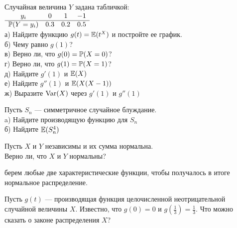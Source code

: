 \begin{solution}
\begin{solution}
\begin{solution}
\begin{solution}
\begin{solution}
\begin{solution}
\begin{problem}
Случайная величина $Y$ задана табличкой: \\
$\begin{array}{cccc}
  y_{i} & 0 & 1 & -1 \\
  \hline
  \P(Y=y_{i}) & 0.3 & 0.2 & 0.5 \\
\end{array}$ \\
а) Найдите функцию $g(t)=\E(t^{X})$ и постройте ее график. \\
б) Чему равно $g(1)$? \\
в) Верно ли, что $g(0)=\P(X=0)$? \\
г) Верно ли, что $g(1)=\P(X=1)$? \\
д) Найдите $g'(1)$ и $\E(X)$ \\
е) Найдите $g''(1)$ и $\E(X(X-1))$ \\
ж) Выразите $\Var(X)$ через $g'(1)$ и $g''(1)$ 
\end{problem} 
\begin{solution} 

\end{solution}

\begin{problem}
Пусть $S_{n}$ --- симметричное случайное блуждание. \\
a) Найдите производящую функцию для $S_{n}$ \\
б) Найдите $\E(S_{n}^{4})$ 
\end{problem} 
\begin{solution} 

\end{solution}

\begin{problem}
Пусть $X$ и $Y$ независимы и их сумма нормальна. \\
Верно ли, что $X$ и $Y$ нормальны? 
\end{problem} 
\begin{solution} 
 берем любые две характеристические функции, чтобы получалось в итоге нормальное распределение. 
\end{solution}

\begin{problem}
Пусть $g(t)$ --- производящая функция целочисленной неотрицательной случайной величины $X$. Известно, что $g(0)=0$ и $g(\frac{1}{3})=\frac{1}{3}$. Что можно сказать о законе распределения $X$? 
\end{problem} 
\begin{solution} 


\end{solution}
\end{solution}
\end{solution}
\end{solution}
\end{solution}
\end{solution}
\end{solution}

